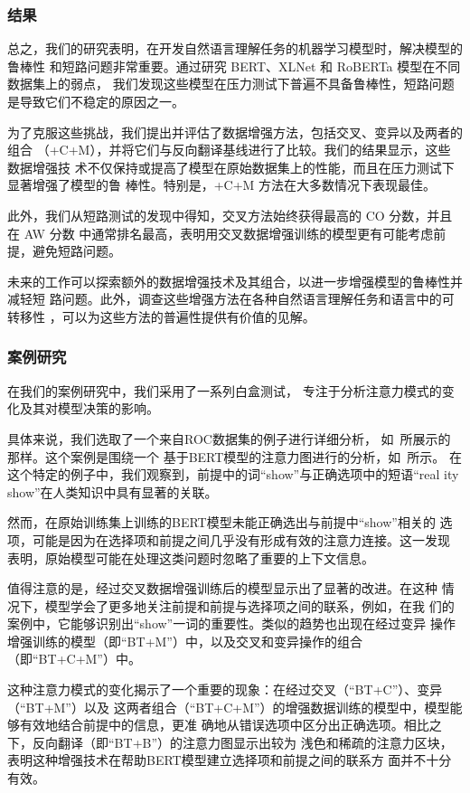 \subsubsection*{结果}
总之，我们的研究表明，在开发自然语言理解任务的机器学习模型时，解决模型的鲁棒性
和短路问题非常重要。通过研究 BERT、XLNet 和 RoBERTa 模型在不同数据集上的弱点，
我们发现这些模型在压力测试下普遍不具备鲁棒性，短路问题是导致它们不稳定的原因之一。

为了克服这些挑战，我们提出并评估了数据增强方法，包括交叉、变异以及两者的组合
（+C+M），并将它们与反向翻译基线进行了比较。我们的结果显示，这些数据增强技
术不仅保持或提高了模型在原始数据集上的性能，而且在压力测试下显著增强了模型的鲁
棒性。特别是，+C+M 方法在大多数情况下表现最佳。

此外，我们从短路测试的发现中得知，交叉方法始终获得最高的 CO 分数，并且在 AW 分数
中通常排名最高，表明用交叉数据增强训练的模型更有可能考虑前提，避免短路问题。

未来的工作可以探索额外的数据增强技术及其组合，以进一步增强模型的鲁棒性并减轻短
路问题。此外，调查这些增强方法在各种自然语言理解任务和语言中的可转移性
，可以为这些方法的普遍性提供有价值的见解。

\subsubsection{案例研究}
\label{sec3:case}

在我们的案例研究中，我们采用了一系列白盒测试，
专注于分析注意力模式的变化及其对模型决策的影响。

具体来说，我们选取了一个来自ROC数据集的例子进行详细分析，
如~所展示的那样。这个案例是围绕一个
基于BERT模型的注意力图进行的分析，如~所示。
在这个特定的例子中，我们观察到，前提中的词``show''与正确选项中的短语``real
ity show''在人类知识中具有显著的关联。

然而，在原始训练集上训练的BERT模型未能正确选出与前提中``show''相关的
选项，可能是因为在选择项和前提之间几乎没有形成有效的注意力连接。这一发现
表明，原始模型可能在处理这类问题时忽略了重要的上下文信息。

值得注意的是，经过交叉数据增强训练后的模型显示出了显著的改进。在这种
情况下，模型学会了更多地关注前提和前提与选择项之间的联系，例如，在我
们的案例中，它能够识别出``show''一词的重要性。类似的趋势也出现在经过变异
操作增强训练的模型（即``BT+M''）中，以及交叉和变异操作的组合（即``BT+C+M''）中。

这种注意力模式的变化揭示了一个重要的现象：在经过交叉（``BT+C''）、变异（``BT+M''）以及
这两者组合（``BT+C+M''）的增强数据训练的模型中，模型能够有效地结合前提中的信息，更准
确地从错误选项中区分出正确选项。相比之下，反向翻译（即``BT+B''）的注意力图显示出较为
浅色和稀疏的注意力区块，表明这种增强技术在帮助BERT模型建立选择项和前提之间的联系方
面并不十分有效。

